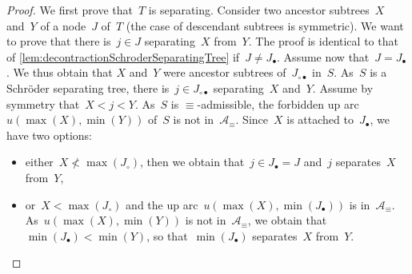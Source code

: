 \documentclass{amsart}
\theoremstyle{definition}
\newcommand{\set}[2]{\left\{ #1 \;\middle|\; #2 \right\}} %
\newcommand{\eqdef}{\mbox{\,\raisebox{0.2ex}{\scriptsize\ensuremath{\mathrm:}}\ensuremath{=}\,}} %
\newcommand{\arcs}{{\mathcal{A}}} %
\begin{document}
\begin{proof}
We first prove that~$T$ is separating. %
Consider two ancestor subtrees~$X$ and~$Y$ of a node~$J$ of~$T$ (the case of descendant subtrees is symmetric).
We want to prove that there is~$j \in J$ separating~$X$ from~$Y$.
The proof is identical to that of \cref{lem:decontractionSchroderSeparatingTree} if~$J \ne J_\bullet$.
Assume now that~$J = J_\bullet$.
We thus obtain that $X$ and~$Y$ were ancestor subtrees of~$J_{\circ\bullet}$ in~$S$.
As~$S$ is a Schröder separating tree, there is~$j \in J_{\circ\bullet}$ separating~$X$ and~$Y$.
Assume by symmetry that~$X < j < Y$.
As~$S$ is $\equiv$-admissible, the forbidden up arc~$u(\max(X), \min(Y))$ of~$S$ is not in~$\arcs_\equiv$.
Since~$X$ is attached to~$J_\bullet$, we have two options:
\begin{itemize}
\item either~$X \not< \max(J_\circ)$, then we obtain that~$j \in J_\bullet = J$ and~$j$ separates~$X$ from~$Y$,
\item or~$X < \max(J_\circ)$ and the up arc~$u(\max(X), \min(J_\bullet))$ is in~$\arcs_\equiv$. As~$u(\max(X), \min(Y))$ is not in~$\arcs_\equiv$, we obtain that~$\min(J_\bullet) < \min(Y)$, so that~$\min(J_\bullet)$ separates~$X$ from~$Y$.
\end{itemize}


\end{proof}
\end{document}
